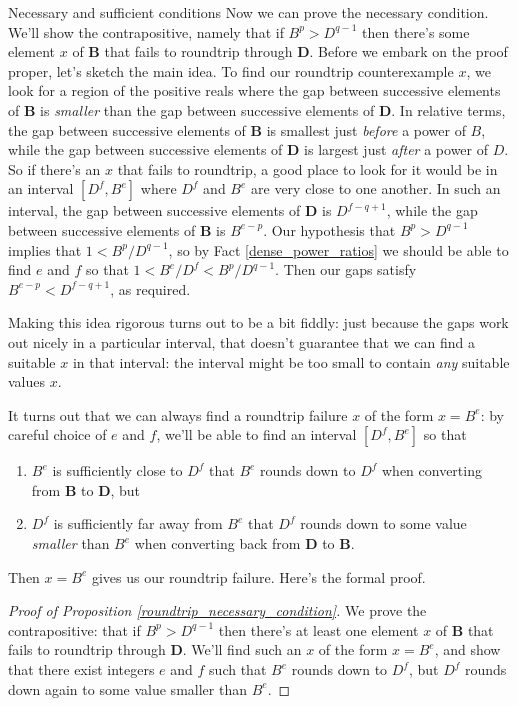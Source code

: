 \documentclass{article}
\theoremstyle{plain}
\theoremstyle{definition}
\begin{document}
\begin{section}{Necessary and sufficient conditions}
Now we can prove the necessary condition. We'll show the contrapositive, namely
that if $B^p > D^{q-1}$ then there's some element $x$ of $\mathbf B$ that fails
to roundtrip through $\mathbf D$. Before we embark on the proof proper, let's
sketch the main idea. To find our roundtrip counterexample $x$, we look for a
region of the positive reals where the gap between successive elements of
$\mathbf B$ is \emph{smaller} than the gap between successive elements of
$\mathbf D$. In relative terms, the gap between successive elements of $\mathbf
B$ is smallest just \emph{before} a power of $B$, while the gap between
successive elements of $\mathbf D$ is largest just \emph{after} a power of
$D$. So if there's an $x$ that fails to roundtrip, a good place to look for it
would be in an interval $[D^f, B^e]$ where $D^f$ and $B^e$ are very close to
one another. In such an interval, the gap between successive elements of
$\mathbf D$ is $D^{f-q+1}$, while the gap between successive elements of
$\mathbf B$ is $B^{e-p}$. Our hypothesis that $B^p > D^{q-1}$ implies that $1 <
B^p / D^{q-1}$, so by Fact \ref{dense_power_ratios} we should be able to find
$e$ and $f$ so that $1 < B^e / D^f < B^p / D^{q-1}$. Then our gaps satisfy
$B^{e-p} < D^{f-q+1}$, as required.

Making this idea rigorous turns out to be a bit fiddly: just because the gaps
work out nicely in a particular interval, that doesn't guarantee that we can
find a suitable $x$ in that interval: the interval might be too small to
contain \emph{any} suitable values $x$.

It turns out that we can always find a roundtrip failure $x$ of the form
$x=B^e$: by careful choice of $e$ and $f$, we'll be able to find an interval
$[D^f, B^e]$ so that
\begin{enumerate}
  \item $B^e$ is sufficiently close to $D^f$ that $B^e$ rounds down to $D^f$
    when converting from $\mathbf B$ to $\mathbf D$, but
  \item $D^f$ is sufficiently far away from $B^e$ that $D^f$ rounds down to
    some value \emph{smaller} than $B^e$ when converting back from $\mathbf D$
    to $\mathbf B$.
\end{enumerate}
Then $x=B^e$ gives us our roundtrip failure. Here's the formal proof.

\begin{proof}[Proof of Proposition \ref{roundtrip_necessary_condition}]
  We prove the contrapositive: that if $B^p > D^{q-1}$ then there's at least
  one element $x$ of $\mathbf B$ that fails to roundtrip through $\mathbf D$.
  We'll find such an $x$ of the form $x=B^e$, and show that there exist
  integers $e$ and $f$ such that $B^e$ rounds down to $D^f$, but $D^f$ rounds
  down again to some value smaller than $B^e$.


\end{proof}
\end{section}
\end{document}
